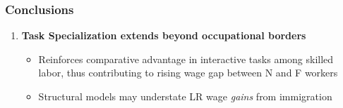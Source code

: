 \documentclass[10pt]{beamer}
\begin{document}






\begin{frame}
	\frametitle{Conclusions}
	
	\begin{enumerate}
		\item \textbf{Task Specialization extends beyond occupational borders}
		\begin{itemize}
			\item Reinforces comparative advantage in interactive tasks among skilled labor, thus contributing to rising wage gap between N and F workers
			\item Structural models may understate LR wage \textit{gains} from immigration
		\end{itemize} 
		
		
		\bigskip
		

\end{enumerate}
\end{frame}
\end{document}
